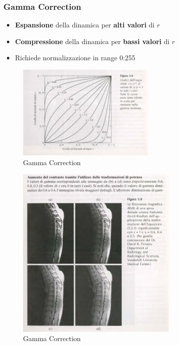 \documentclass[12pt]{article}
\begin{document}
\subsubsection{Gamma Correction}
\begin{itemize}
    \item \textbf{Espansione} della dinamica per \textbf{alti valori} di $r$
    \item \textbf{Compressione} della dinamica per \textbf{bassi valori} di $r$
    \item Richiede normalizzazione in range 0:255
\end{itemize}
\FloatBarrier
\begin{figure}[!htb]
    \centering
    \includegraphics[width=0.6\textwidth]{Images/gamma.png}
    \caption{Gamma Correction}
\end{figure}
\FloatBarrier
\begin{figure}[!htb]
    \centering
    \includegraphics[width=0.7\textwidth]{Images/gamma3.png}
    \caption{Gamma Correction}
\end{figure}
\FloatBarrier
\end{document}
